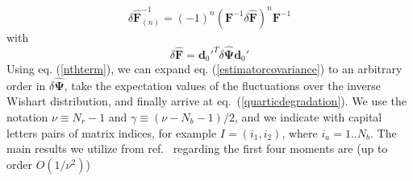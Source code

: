 \documentclass[reprint,aps,prd,superscriptaddress,showkeys,showpacs]{revtex4-1}
\newcommand{\bb}[1]{\mathbf{#1}}
\newcommand{\bbh}[1]{\mathbf{\hat{#1}}}
\begin{document}
\begin{equation}
\label{nthterm}
\delta\bbh{F}^{-1}_{(n)} = (-1)^{n}(\bb{F}^{-1}\delta\bbh{F})^n\bb{F}^{-1}
\end{equation}
%
with
\begin{equation}
\delta\bbh{F} = \bb{d}_0'^T\delta\bbh{\Psi}\bb{d}_0'
\end{equation}
%
Using eq. (\ref{nthterm}), we can expand
eq. (\ref{estimatorcovariance}) to an arbitrary order in
$\delta\bbh{\Psi}$, take the expectation values of the fluctuations
over the inverse Wishart distribution, and finally arrive at
eq.~(\ref{quarticdegradation}). We use the notation $\nu\equiv N_r-1$
and $\gamma\equiv (\nu-N_b-1)/2$, and we indicate with capital letters
pairs of matrix indices, for example $I=(i_1,i_2)$, where
$i_a=1..N_b$. The main results we utilize from
ref.~\citep{MasumotoWishart} regarding the first four moments are (up
to order $O(1/\nu^2)$)
\end{document}
